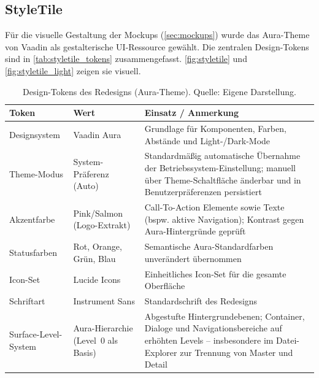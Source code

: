 \subsection{StyleTile}\label{sec:styletile}

Für die visuelle Gestaltung der Mockups (\autoref{sec:mockups}) wurde das Aura-Theme von Vaadin als gestalterische UI-Ressource gewählt. Die zentralen Design-Tokens sind in \autoref{tab:styletile_tokens} zusammengefasst. \autoref{fig:styletile} und \autoref{fig:styletile_light} zeigen sie visuell.

\begin{table}[H]
    \centering
    \scriptsize
    \begin{tabular}{@{}p{2.8cm}p{4.4cm}p{8.9cm}@{}}
        \toprule
        \textbf{Token} & \textbf{Wert} & \textbf{Einsatz / Anmerkung} \\
        \midrule
        Designsystem & Vaadin Aura & Grundlage für Komponenten, Farben, Abstände und Light-/Dark-Mode \\
        \addlinespace
        Theme-Modus & System-Präferenz (Auto) & Standardmäßig automatische Übernahme der Betriebssystem-Einstellung; manuell über Theme-Schaltfläche änderbar und in Benutzerpräferenzen persistiert \\
        \addlinespace
        Akzentfarbe & Pink/Salmon (Logo-Extrakt) & Call-To-Action Elemente sowie Texte (bspw. aktive Navigation); Kontrast gegen Aura-Hintergründe geprüft \\
        \addlinespace
        Statusfarben & Rot, Orange, Grün, Blau & Semantische Aura-Standardfarben unverändert übernommen \\
        \addlinespace
        Icon-Set & Lucide Icons & Einheitliches Icon-Set für die gesamte Oberfläche \\
        \addlinespace
        Schriftart & Instrument Sans & Standardschrift des Redesigns \\
        \addlinespace
        Surface-Level-System & Aura-Hierarchie (Level~0 als Basis) & Abgestufte Hintergrundebenen; Container, Dialoge und Navigationsbereiche auf erhöhten Levels -- insbesondere im Datei-Explorer zur Trennung von Master und Detail \\
        \bottomrule
    \end{tabular}
    \caption[Design-Tokens des Redesigns]{Design-Tokens des Redesigns (Aura-Theme). Quelle: Eigene Darstellung.}
    \label{tab:styletile_tokens}
\end{table}

